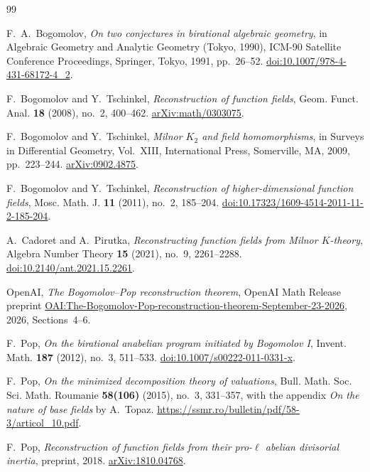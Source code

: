 \begin{thebibliography}{99}

F.~A.~Bogomolov,
\emph{On two conjectures in birational algebraic geometry},
in Algebraic Geometry and Analytic Geometry (Tokyo, 1990),
ICM-90 Satellite Conference Proceedings, Springer, Tokyo, 1991, pp.~26--52.
\href{https://doi.org/10.1007/978-4-431-68172-4_2}{doi:10.1007/978-4-431-68172-4\_2}.

F.~Bogomolov and Y.~Tschinkel,
\emph{Reconstruction of function fields},
Geom. Funct. Anal. \textbf{18} (2008), no.~2, 400--462.
\href{https://arxiv.org/abs/math/0303075}{arXiv:math/0303075}.

F.~Bogomolov and Y.~Tschinkel,
\emph{Milnor $K_2$ and field homomorphisms},
in Surveys in Differential Geometry, Vol.~XIII,
International Press, Somerville, MA, 2009, pp.~223--244.
\href{https://arxiv.org/abs/0902.4875}{arXiv:0902.4875}.

F.~Bogomolov and Y.~Tschinkel,
\emph{Reconstruction of higher-dimensional function fields},
Mosc. Math. J. \textbf{11} (2011), no.~2, 185--204.
\href{https://doi.org/10.17323/1609-4514-2011-11-2-185-204}{doi:10.17323/1609-4514-2011-11-2-185-204}.

A.~Cadoret and A.~Pirutka,
\emph{Reconstructing function fields from Milnor $K$-theory},
Algebra Number Theory \textbf{15} (2021), no.~9, 2261--2288.
\href{https://doi.org/10.2140/ant.2021.15.2261}{doi:10.2140/ant.2021.15.2261}.

OpenAI,
\emph{The Bogomolov--Pop reconstruction theorem},
OpenAI Math Release preprint
\href{https://github.com/openai/math/blob/main/preprints/The-Bogomolov-Pop-reconstruction-theorem-September-23-2026/paper.pdf}{OAI:The-Bogomolov-Pop-reconstruction-theorem-September-23-2026},
2026, Sections~4--6.

F.~Pop,
\emph{On the birational anabelian program initiated by Bogomolov I},
Invent. Math. \textbf{187} (2012), no.~3, 511--533.
\href{https://doi.org/10.1007/s00222-011-0331-x}{doi:10.1007/s00222-011-0331-x}.

F.~Pop,
\emph{On the minimized decomposition theory of valuations},
Bull. Math. Soc. Sci. Math. Roumanie \textbf{58(106)} (2015), no.~3, 331--357,
with the appendix \emph{On the nature of base fields} by A.~Topaz.
\url{https://ssmr.ro/bulletin/pdf/58-3/articol_10.pdf}.

F.~Pop,
\emph{Reconstruction of function fields from their pro-$\ell$ abelian divisorial inertia},
preprint, 2018.
\href{https://arxiv.org/abs/1810.04768}{arXiv:1810.04768}.


\end{thebibliography}
